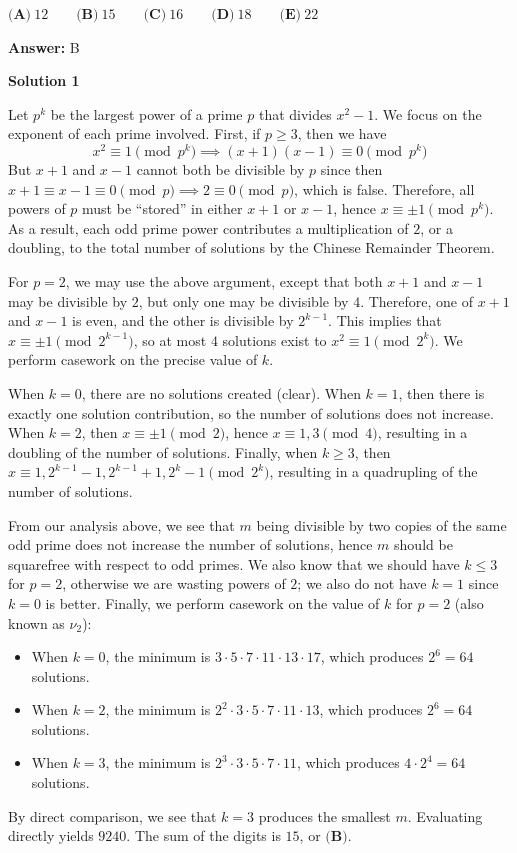\begin{enumerate}
 $\textbf{(A)}\   12  \qquad 	\textbf{(B)}\   15  \qquad 	\textbf{(C)}\   16  \qquad 	\textbf{(D)}\   18  \qquad 	\textbf{(E)}\   22$

 \textbf{Answer: }B



\textbf{Solution 1}

Let $p^k$ be the largest power of a prime $p$ that divides $x^2-1$. We focus on the exponent of each prime involved. First, if $p\ge 3$, then we have
 \[x^2\equiv 1\pmod{p^k}\implies (x+1)(x-1)\equiv 0\pmod{p^k}\]But $x+1$ and $x-1$ cannot both be divisible by $p$ since then $x+1\equiv x-1\equiv 0\pmod{p}\implies 2\equiv 0\pmod{p}$, which is false. Therefore, all powers of $p$ must be “stored” in either $x+1$ or $x-1$, hence $x\equiv \pm 1\pmod{p^k}$. As a result, each odd prime power contributes a multiplication of $2$, or a doubling, to the total number of solutions by the Chinese Remainder Theorem.

 For $p=2$, we may use the above argument, except that both $x+1$ and $x-1$ may be divisible by $2$, but only one may be divisible by $4$. Therefore, one of $x+1$ and $x-1$ is even, and the other is divisible by $2^{k-1}$. This implies that $x\equiv \pm 1\pmod{2^{k-1}}$, so at most $4$ solutions exist to $x^2\equiv 1\pmod{2^k}$. We perform casework on the precise value of $k$.

 When $k=0$, there are no solutions created (clear). When $k=1$, then there is exactly one solution contribution, so the number of solutions does not increase. When $k=2$, then $x\equiv \pm 1\pmod{2}$, hence $x\equiv 1,3\pmod{4}$, resulting in a doubling of the number of solutions. Finally, when $k\ge 3$, then $x\equiv 1,2^{k-1}-1,2^{k-1}+1,2^k-1\pmod{2^k}$, resulting in a quadrupling of the number of solutions.

 From our analysis above, we see that $m$ being divisible by two copies of the same odd prime does not increase the number of solutions, hence $m$ should be squarefree with respect to odd primes. We also know that we should have $k\le 3$ for $p=2$, otherwise we are wasting powers of $2$; we also do not have $k=1$ since $k=0$ is better. Finally, we perform casework on the value of $k$ for $p=2$ (also known as $\nu_2$):

 
            \begin{itemize}
        \item When $k=0$, the minimum is $3\cdot 5\cdot 7\cdot 11\cdot 13\cdot 17$, which produces $2^6=64$ solutions.
        \item When $k=2$, the minimum is $2^2\cdot 3\cdot 5\cdot 7\cdot 11\cdot 13$, which produces $2^6=64$ solutions.
        \item When $k=3$, the minimum is $2^3\cdot 3\cdot 5\cdot 7\cdot 11$, which produces $4\cdot 2^4=64$ solutions.
            \end{itemize}
            By direct comparison, we see that $k=3$ produces the smallest $m$. Evaluating directly yields $9240$. The sum of the digits is $15$, or $\boxed{\textbf{(B)}}$.


\end{enumerate}
